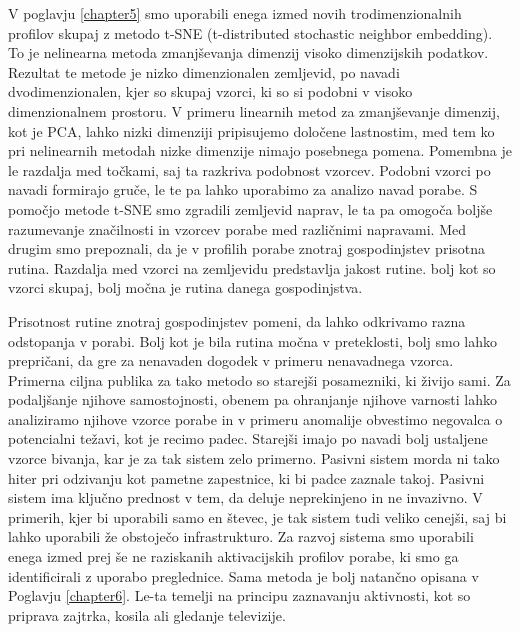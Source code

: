 \begin{sloabstract}
V poglavju \ref{chapter5} smo uporabili enega izmed novih trodimenzionalnih profilov skupaj z metodo t-SNE (t-distributed stochastic neighbor embedding). To je nelinearna metoda zmanjševanja dimenzij visoko dimenzijskih podatkov. Rezultat te metode je nizko dimenzionalen zemljevid, po navadi dvodimenzionalen, kjer so skupaj vzorci, ki so si podobni v visoko dimenzionalnem prostoru. V primeru linearnih metod za zmanjševanje dimenzij, kot je PCA, lahko nizki dimenziji pripisujemo določene lastnostim, med tem ko pri nelinearnih metodah nizke dimenzije nimajo posebnega pomena. Pomembna je le razdalja med točkami, saj ta razkriva podobnost vzorcev. Podobni vzorci po navadi formirajo gruče, le te pa lahko uporabimo za analizo navad porabe. S pomočjo metode t-SNE smo zgradili zemljevid naprav, le ta pa omogoča boljše razumevanje značilnosti in vzorcev porabe med različnimi napravami. Med drugim smo prepoznali, da je v profilih porabe znotraj gospodinjstev prisotna rutina. Razdalja med vzorci na zemljevidu predstavlja jakost rutine. bolj kot so vzorci skupaj, bolj močna je rutina danega gospodinjstva. 

Prisotnost rutine znotraj gospodinjstev pomeni, da lahko odkrivamo razna odstopanja v porabi. Bolj kot je bila rutina močna v preteklosti, bolj smo lahko prepričani, da gre za nenavaden dogodek v primeru nenavadnega vzorca. Primerna ciljna publika za tako metodo so starejši posamezniki, ki živijo sami. Za podaljšanje njihove samostojnosti, obenem pa ohranjanje njihove varnosti lahko analiziramo njihove vzorce porabe in v primeru anomalije obvestimo negovalca o potencialni težavi, kot je recimo padec. Starejši imajo po navadi bolj ustaljene vzorce bivanja, kar je za tak sistem zelo primerno. Pasivni sistem morda ni tako hiter pri odzivanju kot pametne zapestnice, ki bi padce zaznale takoj. Pasivni sistem ima ključno prednost v tem, da deluje neprekinjeno in ne invazivno. V primerih, kjer bi uporabili samo en števec, je tak sistem tudi veliko cenejši, saj bi lahko uporabili že obstoječo infrastrukturo. Za razvoj sistema smo uporabili enega izmed prej še ne raziskanih aktivacijskih profilov porabe, ki smo ga identificirali z uporabo preglednice. Sama metoda je bolj natančno opisana v Poglavju \ref{chapter6}. Le-ta temelji na principu zaznavanju aktivnosti, kot so priprava zajtrka, kosila ali gledanje televizije.  


\end{sloabstract}

